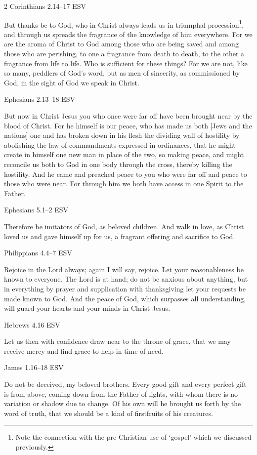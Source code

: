 \documentclass[
]{article}
\newcommand{\RL}[1]{\beginR #1\endR}
\begin{document}
2 Corinthians 2.14--17 ESV

But thanks be to God, who in Christ always leads us in triumphal
procession\footnote{Note the connection with the pre-Christian use of
  `gospel' which we discussed previously.}, and through us spreads the
fragrance of the knowledge of him everywhere. For we are the aroma of
Christ to God among those who are being saved and among those who are
perishing, to one a fragrance from death to death, to the other a
fragrance from life to life. Who is sufficient for these things? For we
are not, like so many, peddlers of God\RL{'}s word, but as men of
sincerity, as commissioned by God, in the sight of God we speak in
Christ.

Ephesians 2.13--18 ESV

But now in Christ Jesus you who once were far off have been brought near
by the blood of Christ. For he himself is our peace, who has made us
both {[}Jews and the nations{]} one and has broken down in his flesh the
dividing wall of hostility by abolishing the law of commandments
expressed in ordinances, that he might create in himself one new man in
place of the two, so making peace, and might reconcile us both to God in
one body through the cross, thereby killing the hostility. And he came
and preached peace to you who were far off and peace to those who were
near. For through him we both have access in one Spirit to the Father.

Ephesians 5.1--2 ESV

Therefore be imitators of God, as beloved children. And walk in love, as
Christ loved us and gave himself up for us, a fragrant offering and
sacrifice to God.

Philippians 4.4--7 ESV

Rejoice in the Lord always; again I will say, rejoice. Let your
reasonableness be known to everyone. The Lord is at hand; do not be
anxious about anything, but in everything by prayer and supplication
with thanksgiving let your requests be made known to God. And the peace
of God, which surpasses all understanding, will guard your hearts and
your minds in Christ Jesus.

Hebrews 4.16 ESV

Let us then with confidence draw near to the throne of grace, that we
may receive mercy and find grace to help in time of need.

James 1.16--18 ESV

Do not be deceived, my beloved brothers. Every good gift and every
perfect gift is from above, coming down from the Father of lights, with
whom there is no variation or shadow due to change. Of his own will he
brought us forth by the word of truth, that we should be a kind of
firstfruits of his creatures.
\end{document}
